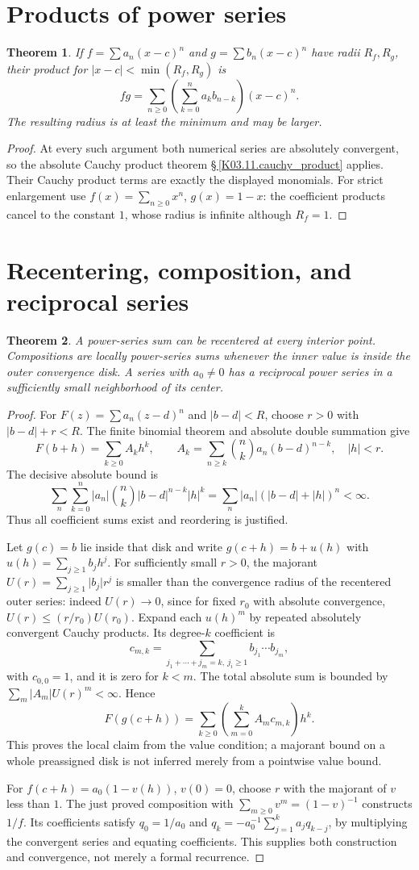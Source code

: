 \documentclass[11pt,oneside,a4paper]{book}
\newtheorem{theorem}{Theorem}[chapter]
\theoremstyle{definition}
\theoremstyle{remark}
\newcommand{\abs}[1]{\lvert#1\rvert}
\newcommand{\KEntry}[2]{\Needspace{7\baselineskip}\section{#2}\label{#1}{\small\sffamily\color{black!60}\detokenize{#1}}\par}
\newcommand{\KRef}[1]{\hyperref[#1]{\S\,\ref*{#1}}}
\begin{document}
\KEntry{K03.13.products}{Products of power series}
\begin{theorem}
If $f=\sum a_n(x-c)^n$ and $g=\sum b_n(x-c)^n$ have radii $R_f,R_g$, their product for $\abs{x-c}<\min(R_f,R_g)$ is
\[fg=\sum_{n\geq0}\left(\sum_{k=0}^na_kb_{n-k}\right)(x-c)^n.\]
The resulting radius is at least the minimum and may be larger.
\end{theorem}
\begin{proof}
At every such argument both numerical series are absolutely convergent, so the absolute Cauchy product theorem \KRef{K03.11.cauchy_product} applies. Their Cauchy product terms are exactly the displayed monomials. For strict enlargement use $f(x)=\sum_{n\geq0}x^n$, $g(x)=1-x$: the coefficient products cancel to the constant $1$, whose radius is infinite although $R_f=1$.
\end{proof}

\KEntry{K03.13.composition}{Recentering, composition, and reciprocal series}
\begin{theorem}
A power-series sum can be recentered at every interior point. Compositions are locally power-series sums whenever the inner value is inside the outer convergence disk. A series with $a_0\ne0$ has a reciprocal power series in a sufficiently small neighborhood of its center.
\end{theorem}
\begin{proof}
For $F(z)=\sum a_n(z-d)^n$ and $\abs{b-d}<R$, choose $r>0$ with $\abs{b-d}+r<R$. The finite binomial theorem and absolute double summation give
\[F(b+h)=\sum_{k\geq0}A_kh^k,\qquad A_k=\sum_{n\geq k}\binom nk a_n(b-d)^{n-k},\quad \abs h<r.\]
The decisive absolute bound is
\[\sum_n\sum_{k=0}^n\abs{a_n}\binom nk\abs{b-d}^{n-k}\abs h^k=\sum_n\abs{a_n}(\abs{b-d}+\abs h)^n<\infty.\]
Thus all coefficient sums exist and reordering is justified.

Let $g(c)=b$ lie inside that disk and write $g(c+h)=b+u(h)$ with $u(h)=\sum_{j\geq1}b_jh^j$. For sufficiently small $r>0$, the majorant $U(r)=\sum_{j\geq1}\abs{b_j}r^j$ is smaller than the convergence radius of the recentered outer series: indeed $U(r)\to0$, since for fixed $r_0$ with absolute convergence, $U(r)\leq(r/r_0)U(r_0)$. Expand each $u(h)^m$ by repeated absolutely convergent Cauchy products. Its degree-$k$ coefficient is
\[c_{m,k}=\sum_{j_1+\cdots+j_m=k,\ j_i\geq1}b_{j_1}\cdots b_{j_m},\]
with $c_{0,0}=1$, and it is zero for $k<m$. The total absolute sum is bounded by $\sum_m\abs{A_m}U(r)^m<\infty$. Hence
\[F(g(c+h))=\sum_{k\geq0}\left(\sum_{m=0}^kA_mc_{m,k}\right)h^k.\]
This proves the local claim from the value condition; a majorant bound on a whole preassigned disk is not inferred merely from a pointwise value bound.

For $f(c+h)=a_0(1-v(h))$, $v(0)=0$, choose $r$ with the majorant of $v$ less than $1$. The just proved composition with $\sum_{m\geq0}v^m=(1-v)^{-1}$ constructs $1/f$. Its coefficients satisfy $q_0=1/a_0$ and $q_k=-a_0^{-1}\sum_{j=1}^ka_jq_{k-j}$, by multiplying the convergent series and equating coefficients. This supplies both construction and convergence, not merely a formal recurrence.
\end{proof}
\end{document}

